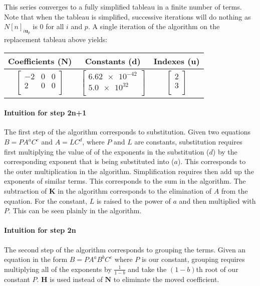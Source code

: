 \documentclass{article}
\newcommand{\matr}[1]{\bm{#1}}
\newcommand{\vect}[1]{\bm{#1}}
\begin{document}
This series converges to a fully simplified tableau in a finite number of terms. Note that when the tableau is simplified, successive iterations will do nothing as $N[n]_{i\vect{u}_p}$ is 0 for all $i$ and $p$. A single iteration of the algorithm on the replacement tableau above yields:
\begin{center}
    \begin{tabular}{c|c|c}
    Coefficients ($\matr{N}$) & Constants ($\vect{d}$)  & Indexes ($\vect{u}$)  \\
    \hline
    $\begin{bmatrix}
      -2 & 0 & 0 \\
       2 & 0 & 0 \\
    \end{bmatrix}$  &
    $\begin{bmatrix}
        \num{6.62e-42} \\
       \num{5.0e32} \\
    \end{bmatrix}$  &
    $\begin{bmatrix}
        2 \\
       3 \\
    \end{bmatrix}$
\end{tabular}
\end{center}

\paragraph{Intuition for step 2n+1}
The first step of the algorithm corresponds to substitution. Given two equations $B=PA^aC^c$ and $A=LC^d$, where $P$ and $L$ are constants, substitution requires first multiplying the value of of the exponents in the substitution ($d$) by the corresponding exponent that is being substituted into ($a$). This corresponds to the outer multiplication in the algorithm. Simplification requires then add up the exponents of similar terms. This corresponds to the sum in the algorithm. The subtraction of $\vect{K}$ in the algorithm corresponds to the elimination of $A$ from the equation. For the constant, $L$ is raised to the power of $a$ and then multiplied with $P$. This can be seen plainly in the algorithm.
\paragraph{Intuition for step 2n}
The second step of the algorithm corresponds to grouping the terms. Given an equation in the form $B=PA^aB^bC^c$ where $P$ is our constant, grouping requires multiplying all of the exponents by $\frac{1}{1-b}$ and take the $(1-b)$th root of our constant $P$. $\matr{H}$ is used instead of $\matr{N}$ to eliminate the moved coefficient.
\end{document}
